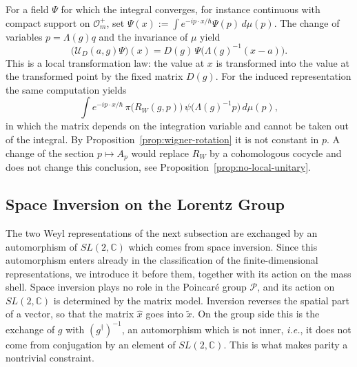 	\begin{remark}\label{rem:position-space}
		For a field $\Psi$ for which the integral converges, for instance continuous with compact support on $\mathcal{O}_m^+$, set $\Psi(x):=\int e^{-ip\cdot x/\hbar}\Psi(p)\,d\mu(p)$. The change of variables $p=\Lambda(g)q$ and the invariance of $\mu$ yield
		\begin{equation*}
			\big(\mathcal{U}_D(a,g)\Psi\big)(x)=D(g)\,\Psi\big(\Lambda(g)^{-1}(x-a)\big).
		\end{equation*}
		This is a local transformation law: the value at $x$ is transformed into the value at the transformed point by the fixed matrix $D(g)$. For the induced representation the same computation yields
		\begin{equation*}
			\int e^{-ip\cdot x/\hbar}\,\pi\big(R_W(g,p)\big)\,\psi\big(\Lambda(g)^{-1}p\big)\,d\mu(p),
		\end{equation*}
		in which the matrix depends on the integration variable and cannot be taken out of the integral. By Proposition~\ref{prop:wigner-rotation} it is not constant in $p$. A change of the section $p\mapsto A_p$ would replace $R_W$ by a cohomologous cocycle and does not change this conclusion, see Proposition~\ref{prop:no-local-unitary}.
	\end{remark}
	
	\subsection*{Space Inversion on the Lorentz Group}
	
	The two Weyl representations of the next subsection are exchanged by an automorphism of $SL(2,\mathbb{C})$ which comes from space inversion. Since this automorphism enters already in the classification of the finite-dimensional representations, we introduce it before them, together with its action on the mass shell. Space inversion plays no role in the Poincar\'e group $\mathcal{P}$, and its action on $SL(2,\mathbb{C})$ is determined by the matrix model. Inversion reverses the spatial part of a vector, so that the matrix $\hat{x}$ goes into $\tilde{x}$. On the group side this is the exchange of $g$ with $(g^\dagger)^{-1}$, an automorphism which is not inner, \textit{i.e.}, it does not come from conjugation by an element of $SL(2,\mathbb{C})$. This is what makes parity a nontrivial constraint.
	
